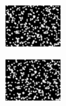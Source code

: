 \documentclass{article}
\begin{document}
\begin{figure}
	\centering
	\begin{subfigure}[htb]{0.45\textwidth}
		\centering
		\includegraphics[width=\textwidth]{../../data/test/x+2_y+2/A.png}
	\end{subfigure}
	\begin{subfigure}[htb]{0.45\textwidth}
		\centering
		\includegraphics[width=\textwidth]{../../data/test/x+2_y+2/B.png}
	\end{subfigure}


\end{figure}
\end{document}

